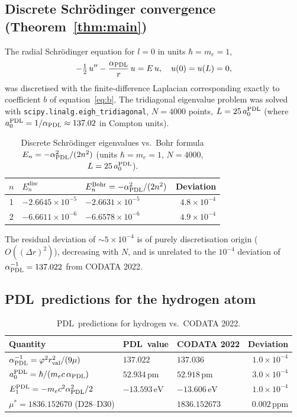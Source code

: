 \documentclass[11pt,a4paper]{article}
\theoremstyle{definition}
\newcommand{\PDL}{\textnormal{PDL}}
\newcommand{\rval}{r_{\mathrm{val}}}
\newcommand{\hb}{\hbar}
\newcommand{\vp}{\varphi}
\newcommand{\aPDL}{\alpha_{\PDL}}
\begin{document}
\subsection{Discrete Schr\"odinger convergence (Theorem~\ref{thm:main})}

The radial Schr\"odinger equation for $l=0$ in units $\hb = m_e = 1$,
\begin{equation}
-\tfrac{1}{2}\,u'' - \frac{\aPDL}{r}\,u = E\,u, \quad u(0) = u(L) = 0,
\label{eq:radial}
\end{equation}
was discretised with the finite-difference Laplacian corresponding exactly to coefficient $b$ of equation~\eqref{eq:b}. The tridiagonal eigenvalue problem was solved with \texttt{scipy.linalg.eigh\_tridiagonal}, $N = 4000$ points, $L = 25\,a_0^{\PDL}$ (where $a_0^{\PDL} = 1/\aPDL \approx 137.02$ in Compton units).

\begin{table}[ht]
\centering
\caption{Discrete Schr\"odinger eigenvalues vs.\ Bohr formula $E_n = -\aPDL^2/(2n^2)$ (units $\hb = m_e = 1$, $N = 4000$, $L = 25\,a_0^{\PDL}$).}
\bigskip
\begin{tabular}{cllr}
\toprule
$n$ & $E_n^{\mathrm{disc}}$ & $E_n^{\mathrm{Bohr}} = -\aPDL^2/(2n^2)$ & Deviation \\
\midrule
1 & $-2.6645\times10^{-5}$ & $-2.6631\times10^{-5}$ & $4.8\times10^{-4}$ \\
2 & $-6.6611\times10^{-6}$ & $-6.6578\times10^{-6}$ & $4.9\times10^{-4}$ \\
\bottomrule
\end{tabular}
\label{tab:spectrum}
\end{table}

The residual deviation of $\sim 5\times10^{-4}$ is of purely discretisation origin ($O((\Delta r)^2)$), decreasing with $N$, and is unrelated to the $10^{-4}$ deviation of $\aPDL^{-1} = 137.022$ from CODATA 2022.

\subsection{\PDL\ predictions for the hydrogen atom}

\begin{table}[ht]
\centering
\caption{\PDL\ predictions for hydrogen vs.\ CODATA 2022.}
\bigskip
\begin{tabular}{lllr}
\toprule
Quantity & \PDL\ value & CODATA 2022 & Deviation \\
\midrule
$\aPDL^{-1} = \vp^2\rval^2/(9\mu)$ & $137.022$ & $137.036$ & $1.0\times10^{-4}$ \\
$a_0^{\PDL} = \hb/(m_e c\,\aPDL)$ & $52.934\,\mathrm{pm}$ & $52.918\,\mathrm{pm}$ & $3.0\times10^{-4}$ \\
$E_1^{\PDL} = -m_e c^2\aPDL^2/2$ & $-13.593\,\mathrm{eV}$ & $-13.606\,\mathrm{eV}$ & $1.0\times10^{-4}$ \\
$\mu^* = 1836.152670$ (D28--D30) & & $1836.152673$ & $0.002\,\mathrm{ppm}$ \\
\bottomrule
\end{tabular}
\label{tab:predictions}
\end{table}
\end{document}
